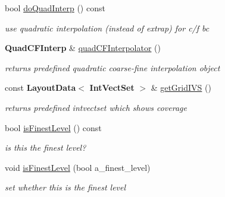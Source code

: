 \begin{DoxyCompactItemize}
\mbox{\label{class_projector_a166fe8e7bb7362e4d41babf3c4dabbe6}} 
bool \hyperlink{class_projector_a166fe8e7bb7362e4d41babf3c4dabbe6}{do\+Quad\+Interp} () const
\begin{DoxyCompactList}\small\item\em use quadratic interpolation (instead of extrap) for c/f bc \end{DoxyCompactList}\item 
\mbox{\label{class_projector_a783a25978cda4802d5d755a837f740b0}} 
\textbf{ Quad\+C\+F\+Interp} \& \hyperlink{class_projector_a783a25978cda4802d5d755a837f740b0}{quad\+C\+F\+Interpolator} ()
\begin{DoxyCompactList}\small\item\em returns predefined quadratic coarse-\/fine interpolation object \end{DoxyCompactList}\item 
\mbox{\label{class_projector_ade3858f0f281582b49acfbe814302e46}} 
const \textbf{ Layout\+Data}$<$ \textbf{ Int\+Vect\+Set} $>$ \& \hyperlink{class_projector_ade3858f0f281582b49acfbe814302e46}{get\+Grid\+I\+VS} ()
\begin{DoxyCompactList}\small\item\em returns predefined intvectset which shows coverage \end{DoxyCompactList}\item 
\mbox{\label{class_projector_a9865cf6c60e422b1c4bb592b919b7935}} 
bool \hyperlink{class_projector_a9865cf6c60e422b1c4bb592b919b7935}{is\+Finest\+Level} () const
\begin{DoxyCompactList}\small\item\em is this the finest level? \end{DoxyCompactList}\item 
\mbox{\label{class_projector_a340a88a867452edf5a322bc2d9e2ec49}} 
void \hyperlink{class_projector_a340a88a867452edf5a322bc2d9e2ec49}{is\+Finest\+Level} (bool a\+\_\+finest\+\_\+level)
\begin{DoxyCompactList}\small\item\em set whether this is the finest level \end{DoxyCompactList}\item 
\mbox{\label{class_projector_a423fb315802ec3c5bf95982bccb082ce}} 

\end{DoxyCompactItemize}
